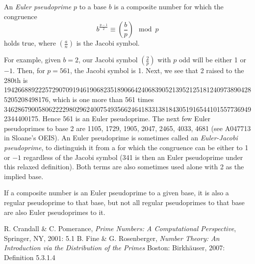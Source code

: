 \documentclass[12pt]{article}
\begin{document}

An {\em Euler pseudoprime} $p$ to a base $b$ is a composite number for which the congruence $$b^{\frac{p - 1}{2}} \equiv \left(\frac{b}{p}\right) \mod p$$ holds true, where $\left(\frac{a}{n}\right)$ is the Jacobi symbol.

For example, given $b = 2$, our Jacobi symbol $\left(\frac{2}{p}\right)$ with $p$ odd will be either 1 or $-1$. Then, for $p = 561$, the Jacobi symbol is 1. Next, we see that 2 raised to the 280th is 1942668892225729070919461906823518906642406839052139521251812409738904285205208498176, which is one more than 561 times 3462867900580622229802962400754935662464183313818430519165441015577369492344400175. Hence 561 is an Euler pseudoprime. The next few Euler pseudoprimes to base 2 are 1105, 1729, 1905, 2047, 2465, 4033, 4681 (see A047713 in Sloane's OEIS). An Euler pseudoprime is sometimes called an {\em Euler-Jacobi pseudoprime}, to distinguish it from a  for which the congruence can be either to 1 or $-1$ regardless of the Jacobi symbol (341 is then an Euler pseudoprime under this relaxed definition). Both terms are also sometimes used alone with 2 as the implied base.

If a composite number is an Euler pseudoprime to a given base, it is also a regular pseudoprime to that base, but not all regular pseudoprimes to that base are also Euler pseudoprimes to it.

\begin{thebibliography}{2}
 R. Crandall \& C. Pomerance, {\it Prime Numbers: A Computational Perspective}, Springer, NY, 2001: 5.1
 B. Fine \& G. Rosenberger, {\it Number Theory: An Introduction via the Distribution of the Primes} Boston: Birkh\"auser, 2007: Definition 5.3.1.4
\end{thebibliography}
\end{document}
